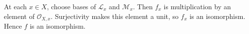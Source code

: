 At each $x\in X$, choose bases of $\mathcal L_x$ and $\mathcal M_x$. Then $f_x$ is multiplication by an element of $\mathcal O_{X,x}$. Surjectivity makes this element a unit, so $f_x$ is an isomorphism. Hence $f$ is an isomorphism.
